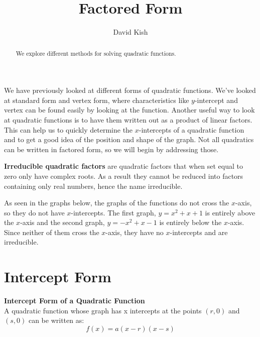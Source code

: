 \documentclass{ximera}
\author{David Kish}
\title{Factored Form}
\begin{document}
\begin{abstract}
We explore different methods for solving quadratic functions.
\end{abstract}
\maketitle
We have previously looked at different forms of quadratic functions. We've looked at standard form and vertex form, where characteristics like $y$-intercept and vertex can be found easily by looking at the function. Another useful way to look at quadratic functions is to have them written out as a product of linear factors. This can help us to quickly determine the $x$-intercepts of a quadratic function and to get a good idea of the position and shape of the graph. Not all quadratics can be written in factored form, so we will begin by addressing those.
\begin{remark}
\textbf{Irreducible quadratic factors} are quadratic factors that when set equal to zero only have complex roots.  As a result they cannot be reduced into factors containing only real numbers, hence the name irreducible. 
\end{remark}
As seen in the graphs below, the graphs of the functions do not cross the $x$-axis, so they do not have $x$-intercepts. The first graph, $y=x^2+x+1$ is entirely above the $x$-axis and the second graph, $y=-x^2+x-1$ is entirely below the $x$-axis. Since neither of them cross the $x$-axis, they have no $x$-intercepts and are irreducible.

\section{Intercept Form}
\begin{callout} \textbf{\large{Intercept Form of a Quadratic Function}}\\
          A quadratic function whose graph has x intercepts at the points $(r,0)$ and $(s,0)$ can be written as:\\
\[
f(x)=a(x-r)(x-s)
\]
\end{callout}

\end{document}
